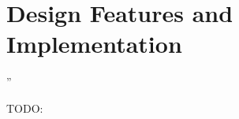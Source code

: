 \chapter{Design Features and Implementation} %
\label{chap:Chapter4}  %

\epigraph{” }{\textit{}}

TODO:
